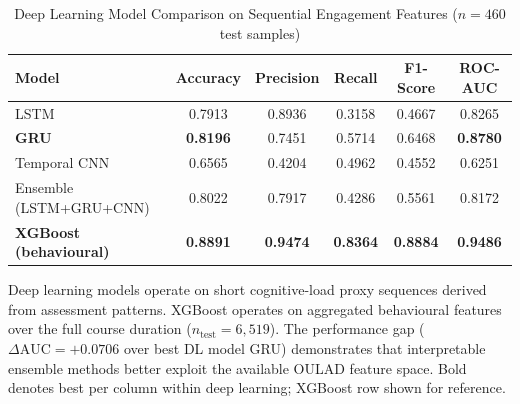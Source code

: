 
\begin{table}[!t]
  \renewcommand{\arraystretch}{1.25}
  \caption{Deep Learning Model Comparison on Sequential Engagement Features ($n = 460$ test samples)}
  \label{tab:deep_learning}
  \centering
  \begin{tabular}{lccccc}
    \hline
    \textbf{Model} & \textbf{Accuracy} & \textbf{Precision} & \textbf{Recall} & \textbf{F1-Score} & \textbf{ROC-AUC} \\
    \hline
    LSTM                    & 0.7913 & 0.8936 & 0.3158 & 0.4667 & 0.8265 \\
    \textbf{GRU}            & \textbf{0.8196} & 0.7451 & 0.5714 & 0.6468 & \textbf{0.8780} \\
    Temporal CNN            & 0.6565 & 0.4204 & 0.4962 & 0.4552 & 0.6251 \\
    Ensemble (LSTM+GRU+CNN) & 0.8022 & 0.7917 & 0.4286 & 0.5561 & 0.8172 \\
    \hline
    \textbf{XGBoost (behavioural)} & \textbf{0.8891} & \textbf{0.9474} & \textbf{0.8364} & \textbf{0.8884} & \textbf{0.9486} \\
    \hline
  \end{tabular}
  \vspace{1mm}
  \begin{flushleft}
    \small Deep learning models operate on short cognitive-load proxy sequences
    derived from assessment patterns. XGBoost operates on aggregated behavioural
    features over the full course duration ($n_{\mathrm{test}} = 6{,}519$).
    The performance gap ($\Delta\mathrm{AUC} = +0.0706$ over best DL model GRU) demonstrates
    that interpretable ensemble methods better exploit the available OULAD feature space.
    Bold denotes best per column within deep learning; XGBoost row shown for reference.
  \end{flushleft}
\end{table}



